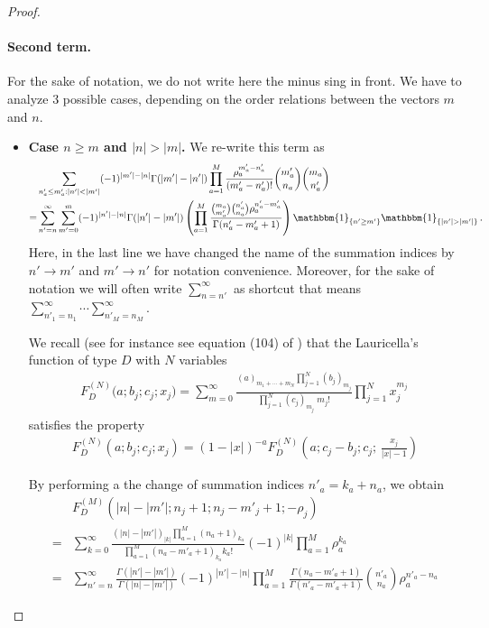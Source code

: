 \documentclass[11pt]{article}
\numberwithin{equation}{section}
\newcommand{\M}{M}
\begin{document}
\begin{proof}
				\paragraph{Second term.}
		For the sake of notation, we do not write here the minus sing in front. We have to analyze $3$ possible cases, depending on the order relations between the vectors $m$ and $n$. 
		\begin{itemize}
			\item \textbf{Case $n\geq m$ and $|n|>|m|$.}
				We re-write this term as
		\begin{equation}
			\begin{split}
						&\sum_{n'_a\leq m'_a:|n'|< |m'|} (-1)^{|m'|-|n|}   \Gamma (|m'|-|n'|)    \prod_{a=1}^{\M}\frac{\rho_{a}^{m'_{a}-n'_a}}{(m'_{a}-n'_a)!}\binom{m'_{a}}{n_a} \binom{m_{a}}{n'_a}
			\\=&
			\sum_{n'=n}^{\infty}
						\sum_{m'=0}^{m}
						(-1)^{|n'|-|n|}\Gamma(|n'|-|m'|)\left(\prod_{a=1}^{\M}\frac{\binom{m_{a}}{m'_{a}}\binom{n'_{a}}{n_{a}}\rho_{a}^{n'_{a}-m'_{a}}}{\Gamma(n'_{a}-m'_{a}+1)}\right)\mathbbm{1}_{\{n'\geq m'\}}\mathbbm{1}_{\{|n'|> |m'|\}}\,.
			\end{split}
		\end{equation}
	Here, in the last line we have changed the name of the summation indices by $n'\to m'$ and $m'\to n'$ for notation convenience.  Moreover, for the sake of notation we will often write $\sum_{n=n'}^{\infty}$ as shortcut that means $\sum_{n'_{1}=n_{1}}^{\infty}\cdots\sum_{n'_{\M}=n_{\M}}^{\infty}$. 

	We recall (see for instance see equation (104) of \cite{lauricella1893sulle}) that the Lauricella's function of type $D$ with $N$ variables   
	\begin{align}\label{definition-lauricella}
		F_D^{(N)}\bigl(a; b_j; c_j; x_j\bigr)
		= \sum_{m=0}^{\infty}
			\frac{(a)_{m_1 + \cdots + m_N} \prod_{j=1}^N (b_j)_{m_j}}
		{\prod_{j=1}^N (c_j)_{m_j} \; m_j!}
		\prod_{j=1}^N x_j^{m_j}\,
	\end{align}
	satisfies the property 
	\begin{align}\label{pfaff-Lau}
		F_D^{(N)}(a; b_j; c_j; x_j)
		= \left(1 - |x|\right)^{-a} 
		F_D^{(N)} \left(
		a;  c_ j- b_j; c_j;\,
		\frac{x_j}{|x| - 1}	\right)
	\end{align}
	
	By performing a the change of summation indices $n'_{a}=k_{a}+n_{a}$, we obtain 
	\begin{equation}\label{F-intermediate}
		\begin{split}
		&F_{D}^{(\M)}(|n|-|m'|;n_{j}+1;n_{j}-m'_{j}+1;-\rho_{j})
		\\=&
		\sum_{k=0}^{\infty}
				\frac{(|n|-|m'|)_{|k|}\prod_{a=1}^{\M}(n_{a}+1)_{k_{a}}}{\prod_{a=1}^{\M}(n_{a}-m'_{a}+1)_{k_{a}}k_{a}!}(-1)^{|k|}\prod_{a=1}^{\M}\rho_{a}^{k_{a}}
							\\=&	\sum_{n'=n}^{\infty}
				\frac{\Gamma(|n'|-|m'|)}{\Gamma(|n|-|m'|)}(-1)^{|n'|-|n|}\prod_{a=1}^{\M}\frac{\Gamma(n_{a}-m'_{a}+1)}{\Gamma(n'_{a}-m'_{a}+1)}\binom{n'_{a}}{n_{a}}\rho_{a}^{n'_{a}-n_{a}}
	\end{split}
		\end{equation}


\end{itemize}
\end{proof}
\end{document}
